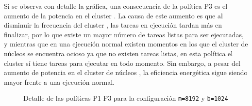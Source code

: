 Si se observa con detalle la gráfica, una consecuencia de la política P3 es
el aumento de la potencia en el cluster \LITTLE. La causa de este aumento es
que al disminuir la frecuencia del cluster \BIG, las tareas en ejecución
tardan más en finalizar, por lo que existe un mayor número de tareas listas
para ser ejecutadas, y mientras que en una ejecución normal existen
momentos en los que el cluster de núcleos \LITTLE se encuentra ocioso ya que
no existen tareas listas, en esta política el cluster sí tiene tareas para
ejecutar en todo momento. Sin embargo, a pesar del aumento de potencia en el
cluster de núcleos \LITTLE, la eficiencia energética sigue siendo mayor frente
a una ejecución normal.

\begin{figure}
  \centering
    \begin{subfigure}{1.0\textwidth}
      \centering
      \caption{\juno}
    \end{subfigure}

    \vspace{0.5cm}

    \begin{subfigure}{1.0\textwidth}
      \centering
      \caption{\odroid}
    \end{subfigure}  
  \caption{Detalle de las políticas P1-P3 para la configuración
    \texttt{m=8192} y \texttt{b=1024}}
  \label{fig:detalle:p1-p4}
\end{figure}

